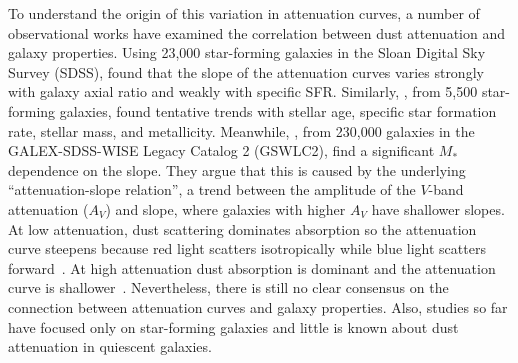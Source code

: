 To understand the origin of this variation in attenuation curves, a number of
observational  works have examined the correlation between dust attenuation and
galaxy properties. Using 23,000 star-forming galaxies in the Sloan Digital
Sky Survey (SDSS), \cite{wild2011} found that the slope of the attenuation
curves varies strongly with galaxy axial ratio and weakly with specific SFR.
Similarly, \cite{battisti2017}, from 5,500 star-forming galaxies, found tentative
trends with stellar age, specific star formation rate, stellar mass, and
metallicity. Meanwhile, \cite{salim2018}, from 230,000 galaxies in the
GALEX-SDSS-WISE Legacy Catalog 2 (GSWLC2), find a significant $M_*$ 
dependence on the slope. They argue that this is caused by the underlying 
``attenuation-slope relation'', a trend between the amplitude of the 
$V$-band attenuation ($A_V$) and slope, where galaxies with higher $A_V$ have
shallower slopes.
At low attenuation, dust scattering dominates absorption so the 
attenuation curve steepens because red light scatters isotropically while blue light
scatters forward~\citep{gordon1994, witt2000, draine2003}. %
At high attenuation dust absorption is dominant and the attenuation curve is
shallower~\citep{chevallard2013}. 
Nevertheless, there is still no clear consensus on the
connection between attenuation curves and galaxy properties. Also, studies 
so far have focused only on star-forming galaxies and little is known
about dust attenuation in quiescent galaxies.

